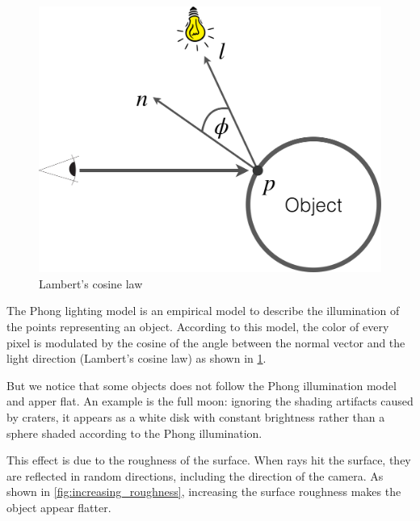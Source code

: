 \documentclass[tikz,14pt,fleqn]{article}
\begin{document}
\begin{figure}
   \includegraphics[width=0.9\linewidth]{fig/Lambert_cosine_law.png} 
   \caption{Lambert's cosine law}
   \label{fig:lambert}
\end{figure}


The Phong lighting model is an empirical model to describe the illumination of the points representing an object.
According to this model, the color of every pixel is modulated by the cosine of the angle between the normal vector and 
the light direction (Lambert's cosine law) as shown in \cref{fig:lambert}.


But we notice that some objects does not follow the Phong illumination model and apper flat. An example is the full moon: 
ignoring the shading artifacts caused by craters, it appears as a white disk with constant brightness
rather than a sphere shaded according to the Phong illumination.

This effect is due to the roughness of the surface. 
When rays hit the surface, they are reflected in random directions, including the direction of the camera.
As shown in \cref{fig:increasing_roughness}, increasing the surface roughness makes the object appear flatter. 
\end{document}

